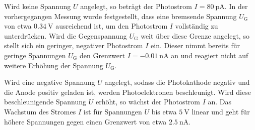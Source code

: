 Wird keine Spannung $U$ angelegt, so beträgt der Photostrom $I = \SI{80}{\pico\ampere}$.
In der vorhergegangen Messung wurde festgestellt, dass eine bremsende Spannung $U_\text{G}$ von etwa $\SI{0.34}{\volt}$ 
ausreichend ist, um den Photostrom $I$ vollständig zu unterdrücken.
Wird die Gegenspannung $U_\text{G}$ weit über diese Grenze angelegt, so stellt sich ein geringer, negativer Photostrom $I$ ein.
Dieser nimmt bereits für geringe Spannungen $U_\text{G}$ den Grenzwert $I=\SI{-0.01}{\nano\ampere}$ an und reagiert nicht auf weitere Erhöhung der Spannung $U_\text{G}$.

Wird eine negative Spannung $U$ angelegt, sodass die Photokathode negativ und die Anode positiv geladen ist, 
werden Photoelektronen beschleunigt.
Wird diese beschleunigende Spannung $U$ erhöht, so wächst der Photostrom $I$ an. 
Das Wachstum des Stromes $I$ ist für Spannungen $U$ bis etwa $\SI{5}{\volt}$ linear und geht für höhere Spannungen gegen einen Grenzwert von etwa $\SI{2.5}{\nano\ampere}$.